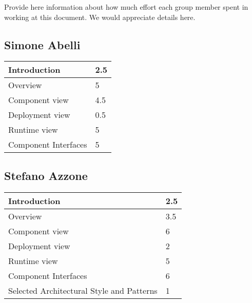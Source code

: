 Provide here information about how much effort each group member spent in working at this document. We would appreciate details here.\\

\subsection{Simone Abelli}
\begin{tabular} { | m{5cm} | m{1cm} | }
	\hline
	Introduction & 2.5\\
	\hline
	Overview & 5\\
	\hline
	Component view & 4.5\\
	\hline
	Deployment view & 0.5\\
	\hline
	Runtime view & 5\\
	\hline
	Component Interfaces & 5\\
	\hline
\end{tabular}

\subsection{Stefano Azzone}
\begin{tabular} { | m{5cm} | m{1cm} | }
	\hline
	Introduction & 2.5\\
	\hline
	Overview & 3.5\\
	\hline
	Component view & 6\\
	\hline
	Deployment view & 2\\
	\hline
	Runtime view & 5\\
	\hline
	Component Interfaces & 6\\
	\hline
	Selected Architectural Style and Patterns & 1\\
	\hline
\end{tabular}